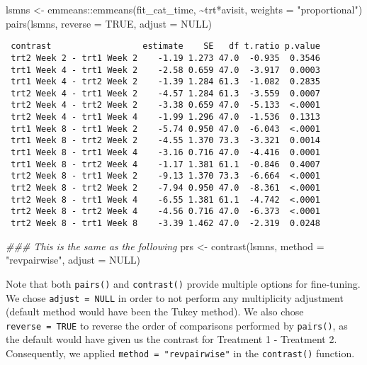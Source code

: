\documentclass[
  letterpaper,
  DIV=11,
  numbers=noendperiod]{scrreprt}
\newenvironment{Shaded}{\begin{snugshade}}{\end{snugshade}}
\newcommand{\AttributeTok}[1]{\textcolor[rgb]{0.40,0.45,0.13}{#1}}
\newcommand{\ConstantTok}[1]{\textcolor[rgb]{0.56,0.35,0.01}{#1}}
\newcommand{\DocumentationTok}[1]{\textcolor[rgb]{0.37,0.37,0.37}{\textit{#1}}}
\newcommand{\FunctionTok}[1]{\textcolor[rgb]{0.28,0.35,0.67}{#1}}
\newcommand{\NormalTok}[1]{\textcolor[rgb]{0.00,0.23,0.31}{#1}}
\newcommand{\OtherTok}[1]{\textcolor[rgb]{0.00,0.23,0.31}{#1}}
\newcommand{\SpecialCharTok}[1]{\textcolor[rgb]{0.37,0.37,0.37}{#1}}
\newcommand{\StringTok}[1]{\textcolor[rgb]{0.13,0.47,0.30}{#1}}
\begin{document}
\begin{Shaded}
\begin{Highlighting}[]
\NormalTok{lsmns }\OtherTok{\textless{}{-}}\NormalTok{ emmeans}\SpecialCharTok{::}\FunctionTok{emmeans}\NormalTok{(fit\_cat\_time, }\SpecialCharTok{\textasciitilde{}}\NormalTok{trt}\SpecialCharTok{*}\NormalTok{avisit, }\AttributeTok{weights =} \StringTok{"proportional"}\NormalTok{)}
\FunctionTok{pairs}\NormalTok{(lsmns, }\AttributeTok{reverse =} \ConstantTok{TRUE}\NormalTok{, }\AttributeTok{adjust =} \ConstantTok{NULL}\NormalTok{)}
\end{Highlighting}
\end{Shaded}

\begin{verbatim}
 contrast                  estimate    SE   df t.ratio p.value
 trt2 Week 2 - trt1 Week 2    -1.19 1.273 47.0  -0.935  0.3546
 trt1 Week 4 - trt1 Week 2    -2.58 0.659 47.0  -3.917  0.0003
 trt1 Week 4 - trt2 Week 2    -1.39 1.284 61.3  -1.082  0.2835
 trt2 Week 4 - trt1 Week 2    -4.57 1.284 61.3  -3.559  0.0007
 trt2 Week 4 - trt2 Week 2    -3.38 0.659 47.0  -5.133  <.0001
 trt2 Week 4 - trt1 Week 4    -1.99 1.296 47.0  -1.536  0.1313
 trt1 Week 8 - trt1 Week 2    -5.74 0.950 47.0  -6.043  <.0001
 trt1 Week 8 - trt2 Week 2    -4.55 1.370 73.3  -3.321  0.0014
 trt1 Week 8 - trt1 Week 4    -3.16 0.716 47.0  -4.416  0.0001
 trt1 Week 8 - trt2 Week 4    -1.17 1.381 61.1  -0.846  0.4007
 trt2 Week 8 - trt1 Week 2    -9.13 1.370 73.3  -6.664  <.0001
 trt2 Week 8 - trt2 Week 2    -7.94 0.950 47.0  -8.361  <.0001
 trt2 Week 8 - trt1 Week 4    -6.55 1.381 61.1  -4.742  <.0001
 trt2 Week 8 - trt2 Week 4    -4.56 0.716 47.0  -6.373  <.0001
 trt2 Week 8 - trt1 Week 8    -3.39 1.462 47.0  -2.319  0.0248
\end{verbatim}

\begin{Shaded}
\begin{Highlighting}[]
\DocumentationTok{\#\#\# This is the same as the following}
\NormalTok{prs }\OtherTok{\textless{}{-}} \FunctionTok{contrast}\NormalTok{(lsmns, }\AttributeTok{method =} \StringTok{"revpairwise"}\NormalTok{, }\AttributeTok{adjust =} \ConstantTok{NULL}\NormalTok{)}
\end{Highlighting}
\end{Shaded}

Note that both \texttt{pairs()} and \texttt{contrast()} provide multiple
options for fine-tuning. We chose \texttt{adjust\ =\ NULL} in order to
not perform any multiplicity adjustment (default method would have been
the Tukey method). We also chose \texttt{reverse\ =\ TRUE} to reverse
the order of comparisons performed by \texttt{pairs()}, as the default
would have given us the contrast for Treatment 1 - Treatment 2.
Consequently, we applied \texttt{method\ =\ "revpairwise"} in the
\texttt{contrast()} function.
\end{document}
